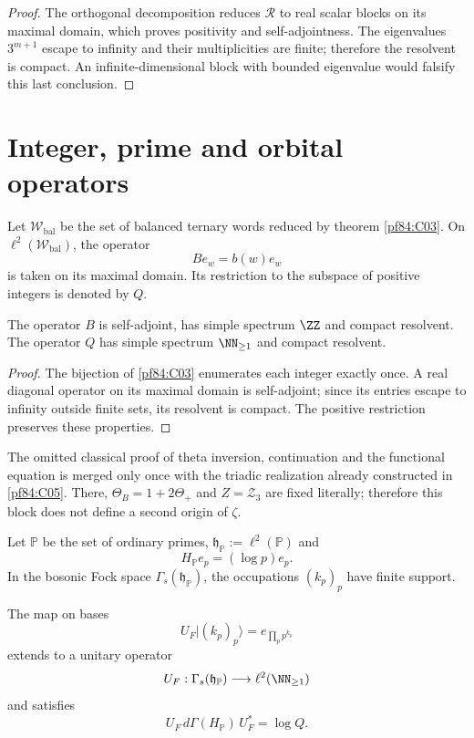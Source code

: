 \begin{proof}
The orthogonal decomposition reduces \(\mathcal R\) to real scalar blocks
on its maximal domain, which proves positivity and self-adjointness. The
eigenvalues \(3^{m+1}\) escape to infinity and their multiplicities are finite;
therefore the resolvent is compact. An infinite-dimensional block with
bounded eigenvalue would falsify this last conclusion.
\end{proof}

\section{Integer, prime and orbital operators}

Let \(\mathscr W_{\mathrm{bal}}\) be the set of balanced ternary
words reduced by theorem
\cref{pf84:C03}. On \(\ell^2(\mathscr W_{\mathrm{bal}})\), the operator
\[
 Be_w=b(w)e_w
\]
is taken on its maximal domain. Its restriction to the subspace of positive
integers is denoted by \(Q\).

\begin{theorem}
\label{pf84:C04}
The operator \(B\) is self-adjoint, has simple spectrum \(\ZZ\) and
compact resolvent. The operator \(Q\) has simple spectrum
\(\NN_{\ge1}\) and compact resolvent.
\end{theorem}

\begin{proof}
The bijection of \cref{pf84:C03} enumerates each integer exactly once. A
real diagonal operator on its maximal domain is self-adjoint; since its entries
escape to infinity outside finite sets, its resolvent is compact. The
positive restriction preserves these properties.
\end{proof}

The omitted classical proof of theta inversion, continuation and the functional
equation is merged only once with the triadic realization already constructed
in \cref{pf84:C05}. There,
\(\Theta_B=1+2\Theta_+\) and \(Z=\mathcal Z_3\) are fixed literally; therefore this block does not
define a second origin of \(\zeta\).

Let \(\mathbb P\) be the set of ordinary primes,
\(\mathfrak h_{\mathbb P}:=\ell^2(\mathbb P)\) and
\[
 H_{\mathbb P}e_p=(\log p)e_p.
\]
In the bosonic Fock space \(\Gamma_s(\mathfrak h_{\mathbb P})\), the occupations
\((k_p)_p\) have finite support.

\begin{theorem}
\label{pf84:C08}
The map on bases
\[
 U_F\lvert(k_p)_p\rangle=e_{\prod_pp^{k_p}}
\]
extends to a unitary operator
\[
 U_F:\Gamma_s(\mathfrak h_{\mathbb P})
 \longrightarrow\ell^2(\NN_{\ge1})
\]
and satisfies
\[
 U_F\,d\Gamma(H_{\mathbb P})\,U_F^*=\log Q.
\]
\end{theorem}

